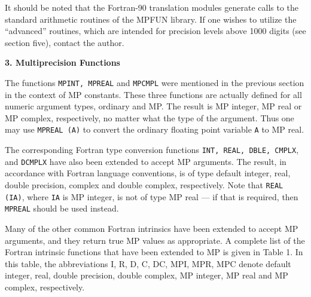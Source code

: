 It should be noted that the Fortran-90 translation modules generate
calls to the standard arithmetic routines of the MPFUN library.  If
one wishes to utilize the ``advanced'' routines, which are intended
for precision levels above 1000 digits (see section five), contact the
author.

\vspace{2ex} \noindent
{\bf 3. Multiprecision Functions}

The functions {\tt MPINT, MPREAL} and {\tt MPCMPL} were mentioned in
the previous section in the context of MP constants.  These three
functions are actually defined for all numeric argument types,
ordinary and MP.  The result is MP integer, MP real or MP complex,
respectively, no matter what the type of the argument.  Thus one may
use {\tt MPREAL (A)} to convert the ordinary floating point variable
{\tt A} to MP real.

The corresponding Fortran type conversion functions {\tt INT, REAL,
DBLE, CMPLX}, and {\tt DCMPLX} have also been extended to accept MP
arguments.  The result, in accordance with Fortran language
conventions, is of type default integer, real, double precision,
complex and double complex, respectively.  Note that {\tt REAL (IA)},
where {\tt IA} is MP integer, is not of type MP real --- if that is
required, then {\tt MPREAL} should be used instead.

Many of the other common Fortran intrinsics have been extended to
accept MP arguments, and they return true MP values as appropriate.  A
complete list of the Fortran intrinsic functions that have been
extended to MP is given in Table 1.  In this table, the abbreviations
I, R, D, C, DC, MPI, MPR, MPC denote default integer, real, double
precision, double complex, MP integer, MP real and MP complex,
respectively.

